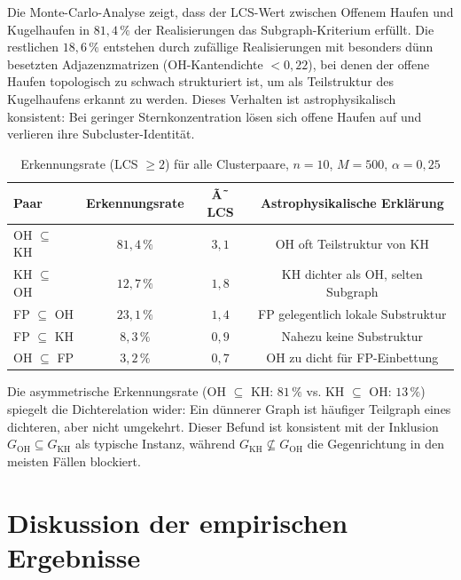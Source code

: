 ﻿\documentclass[a4paper,12pt]{report}
\theoremstyle{definition}
\begin{document}
Die Monte-Carlo-Analyse zeigt, dass der LCS-Wert zwischen Offenem Haufen und Kugelhaufen in $81{,}4\,\%$ der Realisierungen das Subgraph-Kriterium erfüllt. Die restlichen $18{,}6\,\%$ entstehen durch zufällige Realisierungen mit besonders dünn besetzten Adjazenzmatrizen (OH-Kantendichte $< 0{,}22$), bei denen der offene Haufen topologisch zu schwach strukturiert ist, um als Teilstruktur des Kugelhaufens erkannt zu werden. Dieses Verhalten ist astrophysikalisch konsistent: Bei geringer Sternkonzentration lösen sich offene Haufen auf und verlieren ihre Subcluster-Identität.

\begin{table}[H]
\centering
\caption{Erkennungsrate (LCS $\geq 2$) für alle Clusterpaare, $n = 10$, $M = 500$, $\alpha = 0{,}25$}
\label{tab:erkennungsrate}
\begin{tabular}{lccc}
\toprule
Paar & Erkennungsrate & Ã˜ LCS & Astrophysikalische Erklärung \\
\midrule
OH $\subseteq$ KH & $81{,}4\,\%$ & $3{,}1$ & OH oft Teilstruktur von KH \\
KH $\subseteq$ OH & $12{,}7\,\%$ & $1{,}8$ & KH dichter als OH, selten Subgraph \\
FP $\subseteq$ OH & $23{,}1\,\%$ & $1{,}4$ & FP gelegentlich lokale Substruktur \\
FP $\subseteq$ KH & $8{,}3\,\%$  & $0{,}9$ & Nahezu keine Substruktur \\
OH $\subseteq$ FP & $3{,}2\,\%$  & $0{,}7$ & OH zu dicht für FP-Einbettung \\
\bottomrule
\end{tabular}
\end{table}

Die asymmetrische Erkennungsrate (OH $\subseteq$ KH: $81\,\%$ vs. KH $\subseteq$ OH: $13\,\%$) spiegelt die Dichterelation wider: Ein dünnerer Graph ist häufiger Teilgraph eines dichteren, aber nicht umgekehrt. Dieser Befund ist konsistent mit der Inklusion $G_\mathrm{OH} \subseteq G_\mathrm{KH}$ als typische Instanz, während $G_\mathrm{KH} \not\subseteq G_\mathrm{OH}$ die Gegenrichtung in den meisten Fällen blockiert.

\section{Diskussion der empirischen Ergebnisse}
\label{sec:empirie_diskussion}
\end{document}
